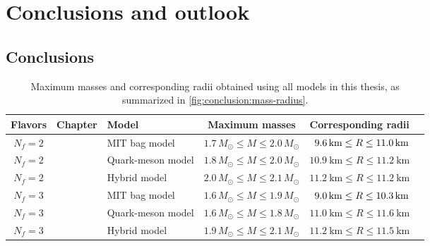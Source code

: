 \chapter{Conclusions and outlook}

\section{Conclusions}

\begin{table}[b!]
\centering
\caption{\label{tab:master_conclusion:results}%
Maximum masses and corresponding radii obtained using all models in this thesis,
as summarized in \cref{fig:conclusion:mass-radius}.
}
{\setlength{\tabcolsep}{4pt} %
\begin{tabular}{ c l l c c c }
	\toprule
	Flavors & Chapter & Model & Maximum masses & Corresponding radii                            \\
	\midrule
	$N_f=2$ & \Cref{chap:mit} & MIT bag model & $1.7 \, M_\odot \leq M \leq 2.0 \, M_\odot$ & $\hphantom{1}\SI{9.6}{\kilo\meter} \leq R \leq \SI{11.0}{\kilo\meter}$ \\
	$N_f=2$ & \Cref{chap:lsm2f} & Quark-meson model & $1.8 \, M_\odot \leq M \leq 2.0 \, M_\odot$ & $\SI{10.9}{\kilo\meter} \leq R \leq \SI{11.2}{\kilo\meter}$ \\
	$N_f=2$ & \Cref{chap:hybrid} & Hybrid model & $2.0 \, M_\odot \leq M \leq 2.1 \, M_\odot$ & $\SI{11.2}{\kilo\meter} \leq R \leq \SI{11.2}{\kilo\meter}$ \\
	\midrule
	$N_f=3$ & \Cref{chap:mit} & MIT bag model & $1.6 \, M_\odot \leq M \leq 1.9 \, M_\odot$ & $\hphantom{1}\SI{9.0}{\kilo\meter} \leq R \leq \SI{10.3}{\kilo\meter}$ \\
	$N_f=3$ & \Cref{chap:lsm3f} & Quark-meson model & $1.6 \, M_\odot \leq M \leq 1.8 \, M_\odot$ & $\SI{11.0}{\kilo\meter} \leq R \leq \SI{11.6}{\kilo\meter}$ \\
	$N_f=3$ & \Cref{chap:hybrid} & Hybrid model & $1.9 \, M_\odot \leq M \leq 2.1 \, M_\odot$ & $\SI{11.2}{\kilo\meter} \leq R \leq \SI{11.5}{\kilo\meter}$ \\
	\bottomrule
\end{tabular}}
\end{table}
